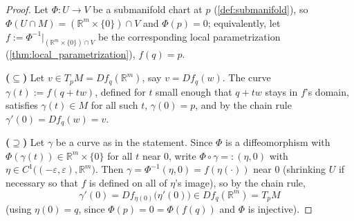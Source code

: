 \begin{proof}
Let $\Phi : U \to V$ be a submanifold chart at $p$ (\cref{def:submanifold}), so
$\Phi(U\cap M) = (\mathbb{R}^m\times\{0\})\cap V$ and $\Phi(p)=0$; equivalently, let
$f := \Phi^{-1}|_{(\mathbb{R}^m\times\{0\})\cap V}$ be the corresponding local parametrization
(\cref{thm:local_parametrization}), $f(q)=p$.

\textbf{($\subseteq$)} Let $v \in T_pM = Df_q(\mathbb{R}^m)$, say $v = Df_q(w)$. The curve
$\gamma(t) := f(q+tw)$, defined for $t$ small enough that $q+tw$ stays in $f$'s domain, satisfies
$\gamma(t) \in M$ for all such $t$, $\gamma(0) = p$, and by the chain rule
$\gamma'(0) = Df_q(w) = v$.

\textbf{($\supseteq$)} Let $\gamma$ be a curve as in the statement. Since $\Phi$ is a
diffeomorphism with $\Phi(\gamma(t)) \in \mathbb{R}^m\times\{0\}$ for all $t$ near $0$, write
$\Phi\circ\gamma =: (\eta,0)$ with $\eta \in C^1\big((-\varepsilon,\varepsilon),\mathbb{R}^m\big)$.
Then $\gamma = \Phi^{-1}(\eta,0) = f(\eta(\cdot))$ near $0$ (shrinking $U$ if necessary so that
$f$ is defined on all of $\eta$'s image), so by the chain rule,
\[\gamma'(0) = Df_{\eta(0)}\big(\eta'(0)\big) \in Df_q(\mathbb{R}^m) = T_pM\]
(using $\eta(0)=q$, since $\Phi(p)=0=\Phi(f(q))$ and $\Phi$ is injective).
\end{proof}

\begin{center}
\end{center}

